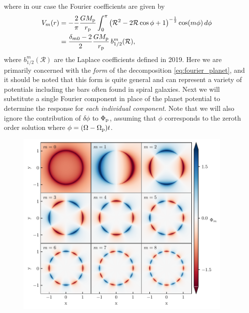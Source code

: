 where in our case the Fourier coefficients are given by 
\begin{align}
    V_m (r) &= - \frac{2}{\pi} \frac{G M_{\rm p}}{r_{\rm p}} \int_0^\pi  \left( \mathcal{R}^2 - 2 \mathcal{R} \cos \phi + 1\right)^{-\frac{1}{2}} \cos (m \phi) \, d\phi \\
    &= \frac{\delta_{m0} - 2}{2} \frac{G M_{\rm p}}{r_{\rm p}} \, b_{1/2}^m (\mathcal{R}),
\end{align}
where $b_{1/2}^m (\mathcal{R})$ are the Laplace coefficients defined in \citet{brouwer1961}  2019.
Here we are primarily concerned with the \textit{form} of the decomposition \ref{eq:fourier_planet}, and it should be noted that this form is quite general and can represent a variety of potentials including the bars often found in spiral galaxies.
Next we will substitute a single Fourier component in place of the planet potential to determine the response for \textit{each individual component}.
Note that we will also ignore the contribution of $\delta \phi$ to $\Phi_{\rm p}$, assuming that $\phi$ corresponds to the zeroth order solution where $\phi = (\Omega - \Omega_{\rm p}) t$. 

\begin{figure}
    \centering
    \includegraphics[width = 0.95\textwidth]{figures/planet_components.pdf}
    \caption{}
    \label{fig:planet_fourier}
\end{figure}

